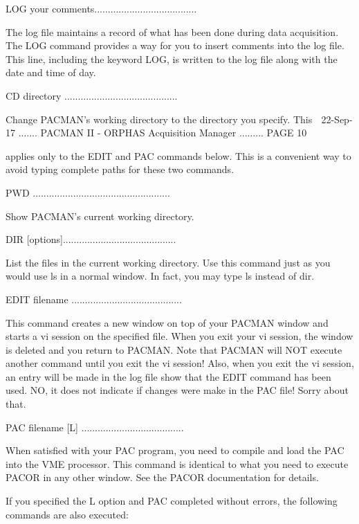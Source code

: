    LOG your comments......................................
 
   The  log  file  maintains  a  record  of  what  has  been  done during data
   acquisition.  The LOG command provides a way  for  you  to  insert comments
   into  the  log  file.   This line, including the keyword LOG, is written to
   the log file along with the date and time of day.
 
   CD directory ..........................................
 
   Change PACMAN's working  directory  to  the  directory  you  specify.  This
    
   22-Sep-17 ....... PACMAN II - ORPHAS Acquisition Manager ......... PAGE  10
 
   applies  only  to the EDIT and PAC commands below. This is a convenient way
   to avoid typing complete paths for these two commands.
 
   PWD ...................................................
 
   Show PACMAN's current working directory.
 
   DIR [options]..........................................
 
   List the files in the current working directory.  Use this command  just as
   you  would  use ls in a normal window.  In fact, you may type ls instead of
   dir.
 
   EDIT filename .........................................
 
   This command creates a new window on top of your PACMAN window  and  starts
   a  vi  session  on  the  specified file. When you exit your vi session, the
   window is deleted and you return to  PACMAN.  Note  that  PACMAN  will  NOT
   execute  another command until you exit the vi session! Also, when you exit
   the vi session, an entry will be made in the log file show  that  the  EDIT
   command  has  been  used.  NO, it does not indicate if changes were make in
   the PAC file! Sorry about that.
 
   PAC filename [L] ......................................
 
   When satisfied with your PAC program, you need to compile and load the  PAC
   into  the  VME  processor.  This  command  is identical to what you need to
   execute PACOR in  any  other  window.   See  the  PACOR  documentation  for
   details.
 
   If  you  specified  the  L  option  and  PAC  completed without errors, the
   following commands are also executed:
 
